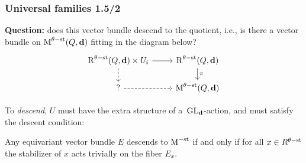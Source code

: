 \documentclass{beamer}
\begin{document}
\begin{frame}
    \frametitle{Universal families 1.5/2}   
{\bf Question:} does this vector bundle descend to the quotient, i.e.,
is there a vector bundle on $\operatorname{M}^{\theta-\mathrm{st}}(Q, \mathbf{d})$
fitting in the diagram below? \pause
\[ \begin{tikzcd}[row sep=0.5cm, ampersand replacement=\&]
    \parameterspace^{\theta\stable}(Q, \tuple{d}) \times U_i \arrow[r]\arrow[d, dashed] \& \parameterspace^{\theta\stable}(Q, \tuple{d}) \arrow[d, "\pi"] \\ 
    {?} \arrow[r, dashed] \& \modulispace^{\theta\stable}(Q, \tuple{d})
\end{tikzcd} \] \pause

To \emph{descend}, $U$ must have the extra structure of
a~$\operatorname{\operatorname{GL}_{\mathbf{d}}}$-action, and must satisfy the descent condition: \pause
\begin{lemma}
    Any equivariant vector bundle $E$ descends to $\operatorname{M}^{-\mathrm{st}}$ if and only if
    for all $x \in R^{\theta-\mathrm{st}}$ the stabilizer of
    $x$ acts trivially on the fiber $E_x$.
\end{lemma}
\end{frame}
\end{document}
